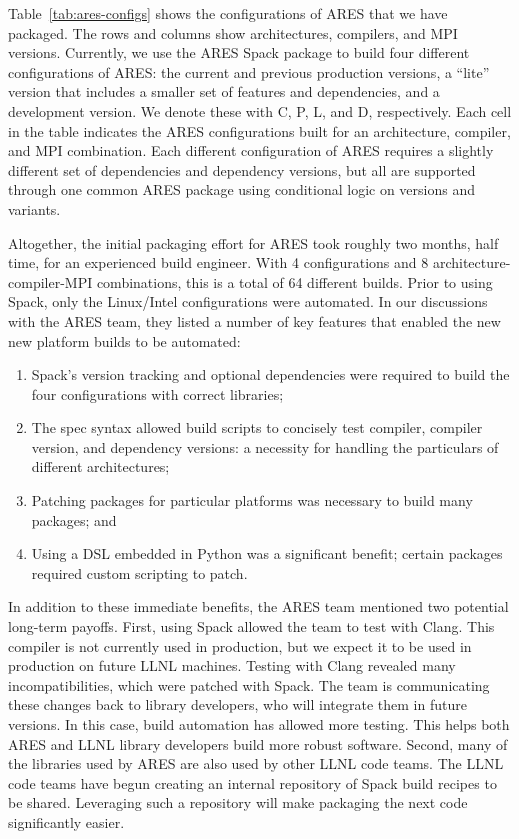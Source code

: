 Table~\ref{tab:ares-configs} shows the configurations of ARES that we have packaged.
The rows and columns show architectures, compilers, and MPI versions.
Currently, we use the ARES Spack package to build four different configurations
of ARES: the current and previous production versions, a ``lite'' version that includes
a smaller set of features and dependencies, and a development version.  We denote these
with C, P, L, and D, respectively.  Each cell in the table indicates the
ARES configurations built for an architecture, compiler, and MPI combination.
Each different configuration of ARES requires a slightly different set of
dependencies and dependency versions, but all are supported through one common
ARES package using conditional logic on versions and variants.

Altogether, the initial packaging effort for ARES took roughly two months,
half time, for an experienced build engineer.  With 4 configurations and 8
architecture-compiler-MPI combinations, this is a total of 64 different builds.
Prior to using Spack, only the Linux/Intel configurations were automated.
In our discussions with the ARES team, they listed a number of key features
that enabled the new new platform builds to be automated:
\begin{enumerate}
\item Spack's version tracking and optional dependencies were required to
      build the four configurations with correct libraries;
\item The spec syntax allowed build scripts to concisely test compiler,
      compiler version, and dependency versions: a necessity
      for handling the particulars of different architectures;
\item Patching packages for particular platforms was
      necessary to build many packages; and
\item Using a DSL embedded in Python was a significant benefit;
      certain packages required custom scripting to patch.
\end{enumerate}

In addition to these immediate benefits, the ARES team mentioned
two potential long-term payoffs. First, using Spack allowed
the team to test with Clang.  This compiler is not currently used in
production, but we expect it to be used in production on future LLNL machines.
Testing with Clang revealed many incompatibilities, which were patched with
Spack. The team is communicating these changes back to library developers,
who will integrate them in future versions.  In this case, build automation
has allowed more testing. This helps both ARES and LLNL library developers
build more robust software.
%
Second, many of the libraries used by ARES are also used by other LLNL code
teams.  The LLNL code teams have begun creating an internal repository of
Spack build recipes to be shared.  Leveraging such a repository will
make packaging the next code significantly easier.
